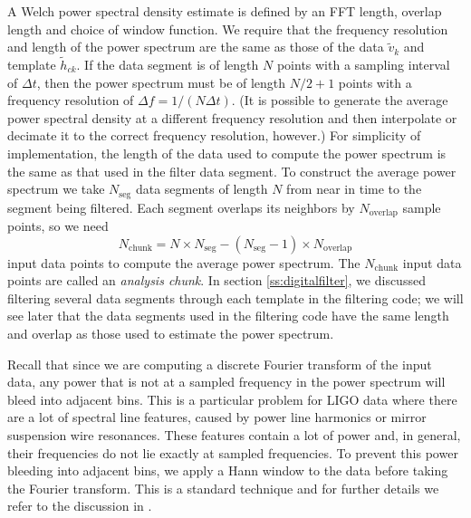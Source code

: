 A Welch power spectral density estimate is defined by an FFT length, overlap
length and choice of window function.  We require that the frequency
resolution and length of the power spectrum are the same as those of the data
$\tilde{v}_k$ and template $\tilde{h}_{ck}$. If the data segment is of length
$N$ points with a sampling interval of $\Delta t$, then the power spectrum
must be of length $N/2 + 1$ points with a frequency resolution of $\Delta f =
1/(N\Delta t)$.  (It is possible to generate the average power spectral density
at a different frequency resolution and then interpolate or decimate it to the
correct frequency resolution, however.) For simplicity of implementation,
the length of the data used to compute the power spectrum is the
same as that used in the filter data segment.  To construct the average power
spectrum we take $N_\mathrm{seg}$ data segments of length $N$ from near in
time to the segment being filtered. Each segment overlaps its neighbors by
$N_\mathrm{overlap}$ sample points, so we need
\begin{equation}
N_\mathrm{chunk} = 
N \times N_\mathrm{seg} - ( N_\mathrm{seg} - 1 ) \times N_\mathrm{overlap}
\end{equation}
input data points to compute the average power spectrum. The
$N_\mathrm{chunk}$ input data points are called an \emph{analysis chunk}.
In section \ref{ss:digitalfilter}, we discussed filtering several data
segments through each template in the filtering code; we will see later that
the data segments used in the filtering code have the same length and 
overlap as those used to estimate the power spectrum. 

Recall that since we are computing a discrete Fourier transform of the input
data, any power that is not at a sampled frequency in the power spectrum will
bleed into adjacent bins. This is a particular problem for LIGO data where
there are a lot of spectral line features, caused by power line harmonics or
mirror suspension wire resonances. These features contain a lot of power and,
in general, their frequencies do not lie exactly at sampled frequencies.
To prevent this power bleeding into adjacent bins, we apply a Hann window to
the data before taking the Fourier transform. This is a standard technique and
for further details we refer to the discussion in \cite{Press:1992}. 

